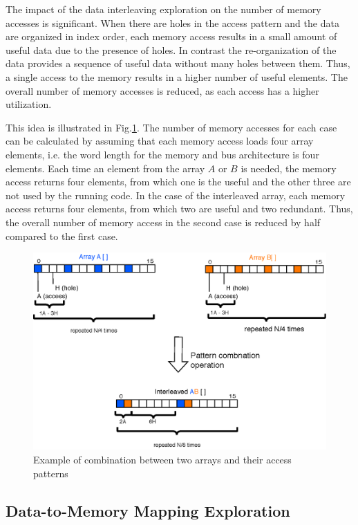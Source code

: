 \documentclass[prodmode,acmtecs]{acmsmall}
\begin{document}
The impact of the data interleaving exploration on the number of memory accesses is significant.
When there are holes in the access pattern and the data are organized in index order, each memory access results in a small amount of useful data due to the presence of holes.
In contrast the re-organization of the data provides a sequence of useful data without many holes between them.
Thus, a single access to the memory results in a higher number of useful elements.
The overall number of memory accesses is reduced, as each access has a higher utilization.

This idea is illustrated in Fig.\ref{fig:algebra}.
The number of memory accesses for each case can be calculated by assuming that each memory access loads four array elements, i.e. the word length for the memory and bus architecture is four elements.
Each time an element from the array $A$ or $B$ is needed, the memory access returns four elements, from which one is the useful and the other three are not used by the running code.
In the case of the interleaved array, each memory access returns four elements, from which two are useful and two redundant.
Thus, the overall number of memory access in the second case is reduced by half compared to the first case.

\begin{figure}
\centering
	\includegraphics[scale = 0.6]{Images/Algebra.eps} 
	\caption{Example of combination between two arrays and their access patterns}
	\label{fig:algebra}
\end{figure}

\subsection{Data-to-Memory Mapping Exploration}
\end{document}

